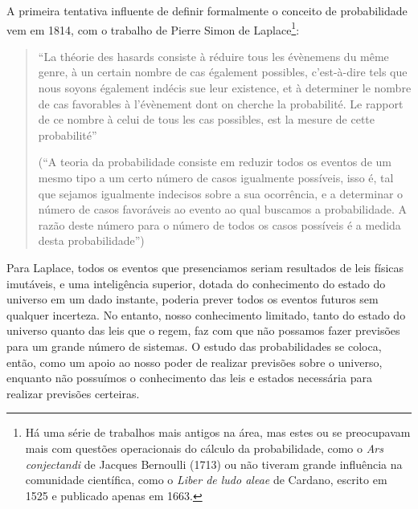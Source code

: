 A primeira tentativa influente de definir formalmente o conceito de probabilidade vem em 1814,
com o trabalho de Pierre Simon de Laplace\footnote{
	Há uma série de trabalhos mais antigos na área, mas estes ou se preocupavam mais com questões
	operacionais do cálculo da probabilidade, como o {\em Ars conjectandi} de Jacques Bernoulli (1713) ou não tiveram 
	grande influência na comunidade científica, como o {\em Liber de ludo aleae} de Cardano, escrito em 1525 e 
	publicado apenas em 1663.
}:

\begin{quote}
``La théorie des hasards consiste à réduire tous les évènemens du même genre, à un certain nombre de cas également
possibles, c'est-à-dire tels que nous soyons également indécis sue leur existence, et à determiner le nombre de cas
favorables à l'évènement dont on cherche la probabilité. Le rapport de ce nombre à celui de tous les cas possibles,
est la mesure de cette probabilité'' 

(``A teoria da probabilidade consiste em reduzir todos os eventos de um mesmo tipo a um certo número de casos igualmente
possíveis, isso é, tal que sejamos igualmente indecisos sobre a sua ocorrência, e a determinar o número de casos
favoráveis ao evento ao qual buscamos a probabilidade. A razão deste número para o número de todos os casos possíveis
é a medida desta probabilidade'')
\citep{Laplace1814}
\end{quote}

Para Laplace, todos os eventos que presenciamos seriam resultados de leis físicas
imutáveis, e uma inteligência superior, dotada do conhecimento do estado do universo em um dado instante, poderia prever
todos os eventos futuros sem qualquer incerteza. No entanto, nosso conhecimento limitado, tanto do estado do universo
quanto das leis que o regem, faz com que não possamos fazer previsões para um grande número de sistemas. O estudo das 
probabilidades se coloca, então, como um apoio ao nosso poder de realizar previsões sobre o universo, 
enquanto não possuímos o conhecimento das leis e estados necessária para realizar previsões certeiras. 

